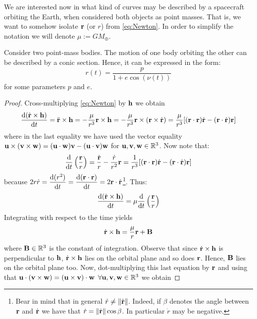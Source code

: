 \documentclass[../main.tex]{subfiles}
\begin{document}
We are interested now in what kind of curves may be described by a spacecraft orbiting the Earth, when considered both objects as point masses. That is, we want to somehow isolate $\boldsymbol{\mathrm{r}}$ (or $r$) from \cref{eq:Newton}. In order to simplify the notation we will denote $\mu:=GM_{\oplus}$.
\begin{proposition}
  \label{prop:two-body}
  Consider two point-mass bodies. The motion of one body orbiting the other can be described by a conic section. Hence, it can be expressed in the form:
  \begin{equation}
    \label{eq:two-body}
    r(t)=\frac{p}{1+e\cos (\nu(t))}
  \end{equation}
  for some parameters $p$ and $e$.
\end{proposition}
\begin{proof}
  Cross-multiplying \cref{eq:Newton} by $\boldsymbol{\mathrm{h}}$ we obtain
  \begin{equation}\label{eq:rtimesh}
    \dv{(\dot{\boldsymbol{\mathrm{r}}}\times\boldsymbol{\mathrm{h}})}{t}=\ddot{\boldsymbol{\mathrm{r}}}\times\boldsymbol{\mathrm{h}}=-\frac{\mu}{r^3}\boldsymbol{\mathrm{r}}\times\boldsymbol{\mathrm{h}}=-\frac{\mu}{r^3}\boldsymbol{\mathrm{r}}\times(\boldsymbol{\mathrm{r}}\times \dot{\boldsymbol{\mathrm{r}}})=\frac{\mu}{r^3}[(\boldsymbol{\mathrm{r}}\cdot{\boldsymbol{\mathrm{r}}})\dot{\boldsymbol{\mathrm{r}}}-(\boldsymbol{\mathrm{r}}\cdot\dot{\boldsymbol{\mathrm{r}}})\boldsymbol{\mathrm{r}}]
  \end{equation}
  where in the last equality we have used the vector equality $\boldsymbol{\mathrm{u}}\times(\boldsymbol{\mathrm{v}}\times\boldsymbol{\mathrm{w}})=(\boldsymbol{\mathrm{u}}\cdot\boldsymbol{\mathrm{w}})\boldsymbol{\mathrm{v}}-(\boldsymbol{\mathrm{u}}\cdot\boldsymbol{\mathrm{v}})\boldsymbol{\mathrm{w}}$ for $\boldsymbol{\mathrm{u}}, \boldsymbol{\mathrm{v}}, \boldsymbol{\mathrm{w}}\in\mathbb{R}^3$. Now note that:
  \begin{equation}
    \dv{}{t}\left(\frac{\boldsymbol{\mathrm{r}}}{r}\right)=\frac{\dot{\boldsymbol{\mathrm{r}}}}{r}-\frac{\dot{r}}{r^2}\boldsymbol{\mathrm{r}}= \frac{1}{r^3}[(\boldsymbol{\mathrm{r}}\cdot{\boldsymbol{\mathrm{r}}})\dot{\boldsymbol{\mathrm{r}}}-(\boldsymbol{\mathrm{r}}\cdot\dot{\boldsymbol{\mathrm{r}}})\boldsymbol{\mathrm{r}}]
  \end{equation}
  because $\displaystyle 2r\dot{r}=\dv{(r^2)}{t}=\dv{(\boldsymbol{\mathrm{r}}\cdot\boldsymbol{\mathrm{r}})}{t}=2\boldsymbol{\mathrm{r}}\cdot\dot{\boldsymbol{\mathrm{r}}}$\footnote{Bear in mind that in general $\dot{r}\ne\left\|\dot{\boldsymbol{\mathrm{r}}}\right\|$. Indeed, if $\beta$ denotes the angle between $\boldsymbol{\mathrm{r}}$ and $\dot{\boldsymbol{\mathrm{r}}}$ we have that $\dot{r}=\left\|\dot{\boldsymbol{\mathrm{r}}}\right\|\cos\beta$. In particular $\dot{r}$ may be negative.}. Thus:
  \begin{equation}
    \dv{(\dot{\boldsymbol{\mathrm{r}}}\times\boldsymbol{\mathrm{h}})}{t}=\mu \dv{}{t}\left(\frac{\boldsymbol{\mathrm{r}}}{r}\right)
  \end{equation}
  Integrating with respect to the time yields
  \begin{equation}\label{eq:rdottimesh}
    \dot{\boldsymbol{\mathrm{r}}}\times \boldsymbol{\mathrm{h}}=\frac{\mu}{r}\boldsymbol{\mathrm{r}}+\boldsymbol{\mathrm{B}}
  \end{equation}
  where $\boldsymbol{\mathrm{B}}\in\mathbb{R}^3$ is the constant of integration. Observe that since $\dot{\boldsymbol{\mathrm{r}}}\times\boldsymbol{\mathrm{h}}$ is perpendicular to $\boldsymbol{\mathrm{h}}$, $\dot{\boldsymbol{\mathrm{r}}}\times\boldsymbol{\mathrm{h}}$ lies on the orbital plane and so does $\boldsymbol{\mathrm{r}}$. Hence, $\boldsymbol{\mathrm{B}}$ lies on the orbital plane too. Now, dot-multiplying this last equation by $\boldsymbol{\mathrm{r}}$ and using that $\boldsymbol{\mathrm{u}}\cdot(\boldsymbol{\mathrm{v}}\times\boldsymbol{\mathrm{w}})=(\boldsymbol{\mathrm{u}}\times\boldsymbol{\mathrm{v}})\cdot\boldsymbol{\mathrm{w}}$ $\forall\boldsymbol{\mathrm{u}},\boldsymbol{\mathrm{v}},\boldsymbol{\mathrm{w}}\in\mathbb{R}^3$ we obtain

\end{proof}
\end{document}
